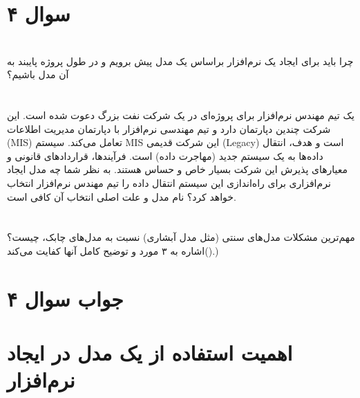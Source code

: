 \section*{سوال ۴}

\section*{}
 چرا باید برای ایجاد یک نرم‌افزار براساس یک مدل پیش برویم و در طول پروژه پایبند به آن مدل باشیم؟

\section*{}
یک تیم مهندس نرم‌افزار برای پروژه‌ای در یک شرکت نفت بزرگ دعوت شده است. این شرکت چندین دپارتمان دارد و تیم مهندسی نرم‌افزار با دپارتمان مدیریت اطلاعات (MIS) تعامل می‌کند. سیستم MIS این شرکت قدیمی (Legacy) است و هدف، انتقال داده‌ها به یک سیستم جدید (مهاجرت داده) است. فرآیندها، قراردادهای قانونی و معیارهای پذیرش این شرکت بسیار خاص و حساس هستند. به نظر شما چه مدل ایجاد نرم‌افزاری برای راه‌اندازی این سیستم انتقال داده را تیم مهندس نرم‌افزار انتخاب خواهد کرد؟ نام مدل و علت اصلی انتخاب آن کافی است.

\section*{}
مهم‌ترین مشکلات مدل‌های سنتی (مثل مدل آبشاری) نسبت به مدل‌های چابک، چیست؟ ()اشاره به ۳ مورد و توضیح کامل آنها کفایت می‌کند.)

\section*{جواب سوال ۴}

\section*{ اهمیت استفاده از یک مدل در ایجاد نرم‌افزار}


